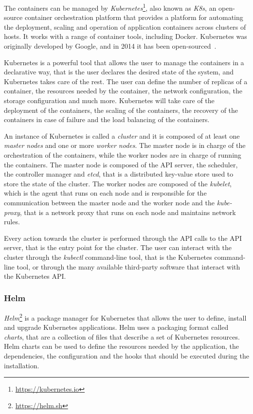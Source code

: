 The containers can be managed by \textit{Kubernetes}\footnote{\url{https://kubernetes.io}}, also known as \textit{K8s}, an open-source container orchestration platform that provides a platform for automating the deployment, scaling and operation of application containers across clusters of hosts. It works with a range of container tools, including Docker. Kubernetes was originally developed by Google, and in 2014 it has been open-sourced~\cite{kubernetes-overview}.

Kubernetes is a powerful tool that allows the user to manage the containers in a declarative way, that is the user declares the desired state of the system, and Kubernetes takes care of the rest. The user can define the number of replicas of a container, the resources needed by the container, the network configuration, the storage configuration and much more. Kubernetes will take care of the deployment of the containers, the scaling of the containers, the recovery of the containers in case of failure and the load balancing of the containers.

An instance of Kubernetes is called a \textit{cluster} and it is composed of at least one \textit{master nodes} and one or more \textit{worker nodes}. The master node is in charge of the orchestration of the containers, while the worker nodes are in charge of running the containers. The master node is composed of the API server, the scheduler, the controller manager and \textit{etcd}, that is a distributed key-value store used to store the state of the cluster. The worker nodes are composed of the \textit{kubelet}, which is the agent that runs on each node and is responsible for the communication between the master node and the worker node and the \textit{kube-proxy}, that is a network proxy that runs on each node and maintains network rules.

Every action towards the cluster is performed through the API calls to the API server, that is the entry point for the cluster. The user can interact with the cluster through the \textit{kubectl} command-line tool, that is the Kubernetes command-line tool, or through the many available third-party software that interact with the Kubernetes API.

\subsubsection{Helm}

\textit{Helm}\footnote{\url{https://helm.sh}} is a package manager for Kubernetes that allows the user to define, install and upgrade Kubernetes applications. Helm uses a packaging format called \textit{charts}, that are a collection of files that describe a set of Kubernetes resources. Helm charts can be used to define the resources needed by the application, the dependencies, the configuration and the hooks that should be executed during the installation.

